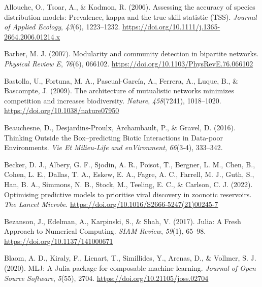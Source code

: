 \documentclass[11pt]{article}
\newlength{\cslhangindent}
\newenvironment{CSLReferences}[2] %
 {%
  \setlength{\parindent}{0pt}
  \ifodd #1 \everypar{\setlength{\hangindent}{\cslhangindent}}\ignorespaces\fi
  \ifnum #2 > 0
  \setlength{\parskip}{#2\baselineskip}
  \fi
 }%
 {}
\begin{document}
\hypertarget{refs}{}
\begin{CSLReferences}{1}{0}
\leavevmode{}%
Allouche, O., Tsoar, A., \& Kadmon, R. (2006). Assessing the accuracy of
species distribution models: Prevalence, kappa and the true skill
statistic (TSS). \emph{Journal of Applied Ecology}, \emph{43}(6),
1223--1232. \url{https://doi.org/10.1111/j.1365-2664.2006.01214.x}

\leavevmode{}%
Barber, M. J. (2007). Modularity and community detection in bipartite
networks. \emph{Physical Review E}, \emph{76}(6), 066102.
\url{https://doi.org/10.1103/PhysRevE.76.066102}

\leavevmode{}%
Bastolla, U., Fortuna, M. A., Pascual-García, A., Ferrera, A., Luque,
B., \& Bascompte, J. (2009). The architecture of mutualistic networks
minimizes competition and increases biodiversity. \emph{Nature},
\emph{458}(7241), 1018--1020. \url{https://doi.org/10.1038/nature07950}

\leavevmode{}%
Beauchesne, D., Desjardins-Proulx, Archambault, P., \& Gravel, D.
(2016). Thinking Outside the Box--predicting Biotic Interactions in
Data-poor Environments. \emph{Vie Et Milieu-Life and enVironment},
\emph{66}(3-4), 333--342.

\leavevmode{}%
Becker, D. J., Albery, G. F., Sjodin, A. R., Poisot, T., Bergner, L. M.,
Chen, B., Cohen, L. E., Dallas, T. A., Eskew, E. A., Fagre, A. C.,
Farrell, M. J., Guth, S., Han, B. A., Simmons, N. B., Stock, M.,
Teeling, E. C., \& Carlson, C. J. (2022). Optimising predictive models
to prioritise viral discovery in zoonotic reservoirs. \emph{The Lancet
Microbe}. \url{https://doi.org/10.1016/S2666-5247(21)00245-7}

\leavevmode{}%
Bezanson, J., Edelman, A., Karpinski, S., \& Shah, V. (2017). Julia: A
Fresh Approach to Numerical Computing. \emph{SIAM Review}, \emph{59}(1),
65--98. \url{https://doi.org/10.1137/141000671}

\leavevmode{}%
Blaom, A. D., Kiraly, F., Lienart, T., Simillides, Y., Arenas, D., \&
Vollmer, S. J. (2020). MLJ: A Julia package for composable machine
learning. \emph{Journal of Open Source Software}, \emph{5}(55), 2704.
\url{https://doi.org/10.21105/joss.02704}


\end{CSLReferences}
\end{document}
